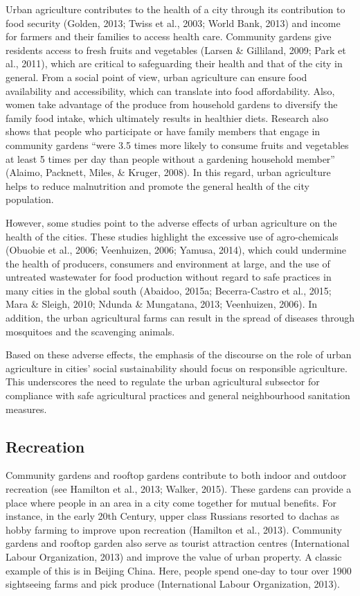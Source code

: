 Urban agriculture contributes to the health of a city through its contribution to food security \cite{Opitz2016} (Golden, 2013; Twiss et al., 2003; World Bank, 2013) and income for farmers and their families to access health care. Community gardens give residents access to fresh fruits and vegetables (Larsen \& Gilliland, 2009; Park et al., 2011), which are critical to safeguarding their health and that of the city in general. From a social point of view, urban agriculture can ensure food availability and accessibility, which can translate into food affordability. Also, women take advantage of the produce from household gardens to diversify the family food intake, which ultimately results in healthier diets. Research also shows that people who participate or have family members that engage in community gardens “were 3.5 times more likely to consume fruits and vegetables at least 5 times per day than people without a gardening household member” (Alaimo, Packnett, Miles, \& Kruger, 2008). In this regard, urban agriculture helps to reduce malnutrition and promote the general health of the city population.

However, some studies point to the adverse effects of urban agriculture on the health of the cities. These studies highlight the excessive use of agro-chemicals (Obuobie et al., 2006; Veenhuizen, 2006; Yamusa, 2014), which could undermine the health of producers, consumers and environment at large, and the use of untreated wastewater for food production without regard to safe practices in many cities in the global south \cite{Amponsah2015} (Abaidoo, 2015a; Becerra-Castro et al., 2015; Mara \& Sleigh, 2010; Ndunda \& Mungatana, 2013; Veenhuizen, 2006). In addition, the urban agricultural farms can result in the spread of diseases through mosquitoes and the scavenging animals.

Based on these adverse effects, the emphasis of the discourse on the role of urban agriculture in cities' social sustainability should focus on responsible agriculture. This underscores the need to regulate the urban agricultural subsector for compliance with safe agricultural practices and general neighbourhood sanitation measures.

\subsection{Recreation}

Community gardens and rooftop gardens contribute to both indoor and outdoor recreation (see Hamilton et al., 2013; Walker, 2015). These gardens can provide a place where people in an area in a city come together for mutual benefits. For instance, in the early 20th Century, upper class Russians resorted to dachas as hobby farming to improve upon recreation (Hamilton et al., 2013). Community gardens and rooftop garden also serve as tourist attraction centres (International Labour Organization, 2013) and improve the value of urban property. A classic example of this is in Beijing China. Here, people spend one-day to tour over 1900 sightseeing farms and pick produce (International Labour Organization, 2013).

